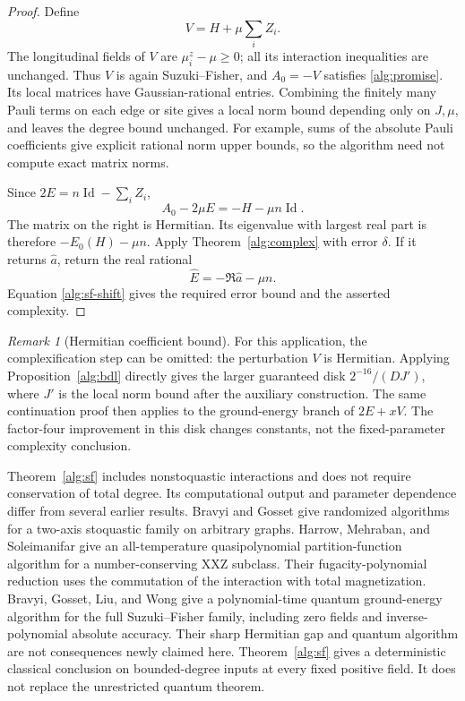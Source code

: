 \documentclass[reqno]{amsart}
\theoremstyle{definition}
\theoremstyle{remark}
\newtheorem{remark}[theorem]{Remark}
\DeclareMathOperator{\Id}{Id}
\begin{document}
\begin{proof}
Define
\[
 V=H+\mu\sum_i Z_i.
 \]
The longitudinal fields of \(V\) are \(\mu_i^z-\mu\ge0\);
all its interaction inequalities are unchanged.
Thus \(V\) is again Suzuki--Fisher, and
\(A_0=-V\) satisfies \eqref{alg:promise}.
Its local matrices have Gaussian-rational entries.
Combining the finitely many Pauli terms on each edge or site
gives a local norm bound depending only on \(J,\mu\), and leaves
the degree bound unchanged.
For example, sums of the absolute Pauli coefficients give
explicit rational norm upper bounds, so the algorithm need not
compute exact matrix norms.

Since \(2E=n\Id-\sum_i Z_i\),
\begin{equation}
 A_0-2\mu E=-H-\mu n\Id.
 \label{alg:sf-shift}
\end{equation}
The matrix on the right is Hermitian.  Its eigenvalue with
largest real part is therefore
\(-E_0(H)-\mu n\).
Apply Theorem~\ref{alg:complex} with error \(\delta\).
If it returns \(\widehat a\), return the real rational
\[
 \widehat E=-\Re\widehat a-\mu n.
 \]
Equation \eqref{alg:sf-shift} gives the required error bound
and the asserted complexity.
\end{proof}

\begin{remark}[Hermitian coefficient bound]
\label{alg:hermitian-radius}
For this application, the complexification step can be omitted:
the perturbation \(V\) is Hermitian.  Applying
Proposition~\ref{alg:bdl} directly gives the larger guaranteed
disk \(2^{-16}/(DJ')\), where \(J'\) is the local norm bound
after the auxiliary construction.  The same continuation proof
then applies to the ground-energy branch of \(2E+xV\).
The factor-four improvement in this disk changes constants,
not the fixed-parameter complexity conclusion.
\end{remark}

Theorem~\ref{alg:sf} includes nonstoquastic interactions and
does not require conservation of total degree.  Its computational
output and parameter dependence differ from several earlier
results.  Bravyi and Gosset \cite{BG17} give randomized
algorithms for a two-axis stoquastic family on arbitrary graphs.
Harrow, Mehraban, and Soleimanifar \cite[Section~7 of the full version]{HMS20}
give an all-temperature quasipolynomial partition-function
algorithm for a number-conserving XXZ subclass.  Their
fugacity-polynomial reduction uses the commutation of the
interaction with total magnetization.
Bravyi, Gosset, Liu, and Wong \cite{BGLW26} give a polynomial-time
quantum ground-energy algorithm for the full Suzuki--Fisher
family, including zero fields and inverse-polynomial absolute
accuracy.  Their sharp Hermitian gap and quantum algorithm are
not consequences newly claimed here.
Theorem~\ref{alg:sf} gives a deterministic classical conclusion
on bounded-degree inputs at every fixed positive field.
It does not replace the unrestricted quantum theorem.
\end{document}
